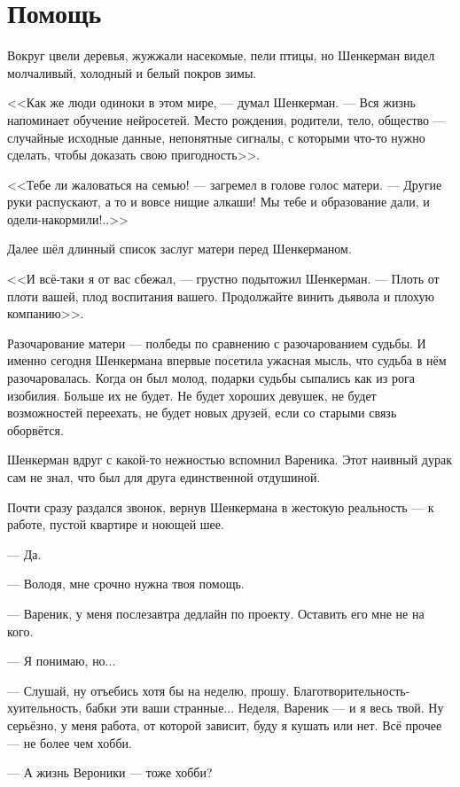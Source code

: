 \documentclass[a4paper,10pt,fleqn]{book}\usepackage{polyglossia}\setdefaultlanguage{english}\setotherlanguage{russian}\defaultfontfeatures{Ligatures=TeX,Mapping=tex-text} \usepackage{xcolor}\definecolor{lightgray}{HTML}{bbbbbb}\color{lightgray}\newcommand{\ml}[3]{\textcolor{black}{#3}}
\begin{document}
\section{Помощь}

Вокруг цвели деревья, жужжали насекомые, пели птицы, но Шенкерман видел молчаливый, холодный и белый покров зимы.

<<Как же люди одиноки в этом мире, --- думал Шенкерман.
--- Вся жизнь напоминает обучение нейросетей.
Место рождения, родители, тело, общество --- случайные исходные данные, непонятные сигналы, с которыми что-то нужно сделать, чтобы доказать свою пригодность>>.

<<Тебе ли жаловаться на семью! --- загремел в голове голос матери.
--- Другие руки распускают, а то и вовсе нищие алкаши!
Мы тебе и образование дали, и одели-накормили!..>>

Далее шёл длинный список заслуг матери перед Шенкерманом.

<<И всё-таки я от вас сбежал, --- грустно подытожил Шенкерман.
--- Плоть от плоти вашей, плод воспитания вашего.
Продолжайте винить дьявола и плохую компанию>>.

Разочарование матери --- полбеды по сравнению с разочарованием судьбы.
И именно сегодня Шенкермана впервые посетила ужасная мысль, что судьба в нём разочаровалась.
Когда он был молод, подарки судьбы сыпались как из рога изобилия.
Больше их не будет.
Не будет хороших девушек, не будет возможностей переехать, не будет новых друзей, если со старыми связь оборвётся.

Шенкерман вдруг с какой-то нежностью вспомнил Вареника.
Этот наивный дурак сам не знал, что был для друга единственной отдушиной.

Почти сразу раздался звонок, вернув Шенкермана в жестокую реальность --- к работе, пустой квартире и ноющей шее.

--- Да.

--- Володя, мне срочно нужна твоя помощь.

--- Вареник, у меня послезавтра дедлайн по проекту.
Оставить его мне не на кого.

--- Я понимаю, но...

--- Слушай, ну отъебись хотя бы на неделю, прошу.
Благотворительность-хуительность, бабки эти ваши странные...
Неделя, Вареник --- и я весь твой.
Ну серьёзно, у меня работа, от которой зависит, буду я кушать или нет.
Всё прочее --- не более чем хобби.

--- А жизнь Вероники --- тоже хобби?
\end{document}
